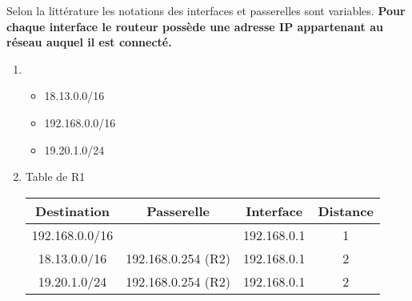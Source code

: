 \documentclass[a4paper,11pt]{article}
\begin{document}
\begin{exo}
    \begin{aretenir}[Remarque]
        Selon la littérature les notations des interfaces et passerelles sont variables. \textbf{Pour chaque interface le routeur possède une adresse IP appartenant au réseau auquel il est connecté.}
    \end{aretenir}
    \begin{enumerate}
        \item \begin{itemize}
            \item 18.13.0.0/16
            \item 192.168.0.0/16
            \item 19.20.1.0/24
        \end{itemize}
        \item Table de R1
        \begin{center}
            \begin{tabular}{|*{4}{c|}}
                \hline
                Destination & Passerelle & Interface & Distance \\
                \hline
                192.168.0.0/16 & & 192.168.0.1 & 1\\
                \hline
                18.13.0.0/16 & 192.168.0.254 (R2) & 192.168.0.1 & 2\\
                \hline
                19.20.1.0/24 & 192.168.0.254 (R2) & 192.168.0.1 & 2\\
                \hline
            \end{tabular}
        \end{center}
    \end{enumerate}
\end{exo}
\end{document}
